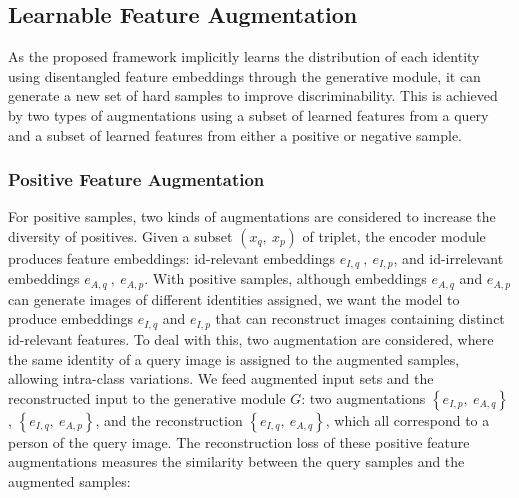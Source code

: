 \subsection{Learnable Feature Augmentation} 
\label{sec:reconstruction_loss}
As the proposed framework implicitly learns the distribution of each identity using disentangled feature embeddings through the generative module,  it can generate a new set of hard samples to improve discriminability. This is achieved by two types of augmentations using a subset of learned features from a query and a subset of learned features from either a positive or negative sample.  
\subsubsection{Positive Feature Augmentation} For positive samples, two kinds of augmentations are considered to increase the diversity of positives. Given a subset $\left( x_{\scriptscriptstyle q}, \: x_{\scriptscriptstyle p}\right)$ of triplet, the encoder module produces feature embeddings: id-relevant embeddings $e_{\scriptscriptstyle I, q} \:, \: e_{\scriptscriptstyle I, p}$, and id-irrelevant embeddings  $e_{\scriptscriptstyle A, q} \: , \: e_{\scriptscriptstyle A, p}$. 
With positive samples, although embeddings $e_{\scriptscriptstyle A, q}$ and $e_{\scriptscriptstyle A, p}$ can generate images of different identities assigned, we want the model to produce embeddings $e_{\scriptscriptstyle I, q}$ and $e_{\scriptscriptstyle I, p}$ that can reconstruct images containing distinct id-relevant features.
To deal with this, two augmentation are considered, where the same identity of a query image is assigned to the augmented samples, allowing intra-class variations. We feed augmented input sets and the reconstructed input to the generative module $G$: two augmentations $\left\{ e_{\scriptscriptstyle I, p}, \:e_{\scriptscriptstyle A, q} \right\}$, $\left\{ e_{\scriptscriptstyle I, q}, \:e_{\scriptscriptstyle A, p} \right\}$, and the reconstruction $\left\{ e_{\scriptscriptstyle I, q}, \:e_{\scriptscriptstyle A, q} \right\}$, which all correspond to a person of the query image. The reconstruction loss of these positive feature augmentations measures the similarity between the query samples and the augmented samples: 
